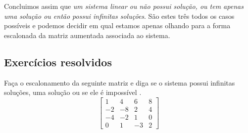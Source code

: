 Concluimos assim que \textit{um sistema linear ou não possui solução, ou tem apenas uma solução ou então possui infinitas soluções}. São estes três todos os casos possíveis e podemos decidir em qual estamos apenas olhando para a forma escalonada da matriz aumentada associada ao sistema.

\subsection*{Exercícios resolvidos}

\construirExeresol

\begin{exeresol}
Faça o escalonamento da seguinte matriz e diga se o sistema possui infinitas soluções, uma solução ou se ele é impossível .
\begin{equation}
 \left[
  \begin{array}{ccc|c}
    1 & 4 & 6 & 8 \\
    -2 & -8 & 2 & 4 \\
    -4 & -2 & 1 & 0 \\
    0 & 1 & -3 & 2
  \end{array}
\right]
\end{equation}
\end{exeresol}
